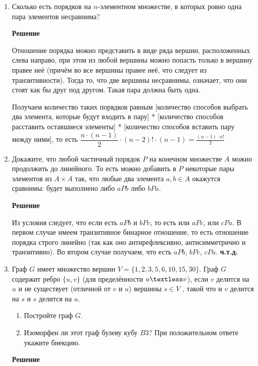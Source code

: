 \documentclass[12pt]{article}
\begin{document}
\begin{enumerate}[label={\textbf{\arabic{section}.\arabic*}}]
		\item  Сколько есть порядков на $n$-элементном множестве, в которых ровно одна пара элементов несравнима?
		
		\textbf{Решение}
		
		Отношение порядка можно представить в виде ряда вершин, расположенных слева направо, при этом из любой вершины можно попасть только в вершину правее неё (причём во все вершины правее неё, что следует из транзитивности). Тогда то, что две вершины несравнимы, означает, что они стоят как бы друг под другом. Такая пара должна быть одна.
		
		Получаем количество таких порядков равным [количество способов выбрать два элемента, которые будут входить в пару] * [количество способов расставить оставшиеся элементы] * [количество способов вставить пару между ними], то есть $\dfrac{n \cdot (n-1)}{2} \cdot (n-2)! \cdot (n-1) = \frac{(n-1) \cdot n!}{2}$
		
		\item Докажите, что любой частичный порядок $P$ на конечном множестве $A$ можно продолжить до линейного. То есть можно добавить в $P$ некоторые пары элементов из $A\times A$ так, что любые два элемента $a, b\in A$ окажутся сравнимы: будет выполнено либо $aPb$ либо $bPa$.
		
		\textbf{Решение}
		
		Из условия следует, что если есть $aPb$ и $bPc$, то есть или $aPc$, или $cPa$. В первом случае имеем транзитивное бинарное отношение, то есть отношение порядка строго линейно (так как оно антирефлексивно, антисимметрично и транзитивно). Во втором случае получаем, что есть $aPb$, $bPc$, $cPa$. \textbf{ч.т.д.}
		
		\item Граф $G$ имеет множество вершин $V = \{1, 2, 3, 5, 6, 10, 15, 30\}$. Граф $G$ содержит ребро $\{u, v\}$ (для пределённости $u\textless v$), если $v$ делится на $u$ и не существует (отличной от $v$ и $u$) вершины $s\in V$ , такой что и $v$ делится на $s$ и $s$ делится на $u$.
		\begin{enumerate}[label=\textbf{\alph*)}]
			\item Постройте граф $G$.
			\item Изоморфен ли этот граф булеву кубу $B3$? При положительном ответе укажите биекцию.
		\end{enumerate}
	
		\textbf{Решение}
		

\end{enumerate}
\end{document}
